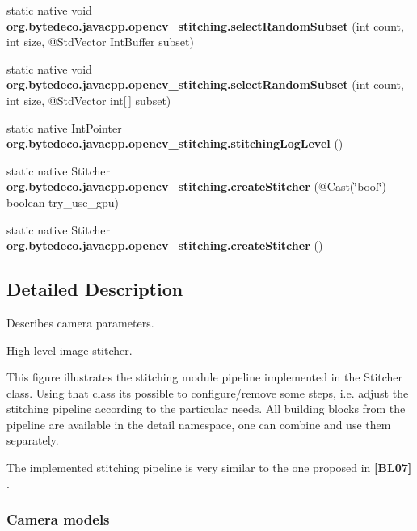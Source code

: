\begin{DoxyCompactItemize}
static native void {\bfseries org.\+bytedeco.\+javacpp.\+opencv\+\_\+stitching.\+select\+Random\+Subset} (int count, int size, @Std\+Vector Int\+Buffer subset)
\item 
\mbox{\label{group__stitching_gabeab870f5610bf0e4f79cdcf9e0a4b6d}} 
static native void {\bfseries org.\+bytedeco.\+javacpp.\+opencv\+\_\+stitching.\+select\+Random\+Subset} (int count, int size, @Std\+Vector int\mbox{[}$\,$\mbox{]} subset)
\item 
\mbox{\label{group__stitching_ga986597ffca49e8fe31dfbf9ead6da54a}} 
static native Int\+Pointer {\bfseries org.\+bytedeco.\+javacpp.\+opencv\+\_\+stitching.\+stitching\+Log\+Level} ()
\item 
\mbox{\label{group__stitching_gaef4d75a2140cded1c24c78e5fe93363e}} 
static native Stitcher {\bfseries org.\+bytedeco.\+javacpp.\+opencv\+\_\+stitching.\+create\+Stitcher} (@Cast(\char`\"{}bool\char`\"{}) boolean try\+\_\+use\+\_\+gpu)
\item 
\mbox{\label{group__stitching_ga58b64c2423052839107c67b767241fae}} 
static native Stitcher {\bfseries org.\+bytedeco.\+javacpp.\+opencv\+\_\+stitching.\+create\+Stitcher} ()
\end{DoxyCompactItemize}


\subsection{Detailed Description}
Describes camera parameters. 

High level image stitcher.

This figure illustrates the stitching module pipeline implemented in the Stitcher class. Using that class it\textquotesingle{}s possible to configure/remove some steps, i.\+e. adjust the stitching pipeline according to the particular needs. All building blocks from the pipeline are available in the detail namespace, one can combine and use them separately. 

The implemented stitching pipeline is very similar to the one proposed in {\bfseries [B\+L07]} . 

 

\subsubsection*{Camera models }

